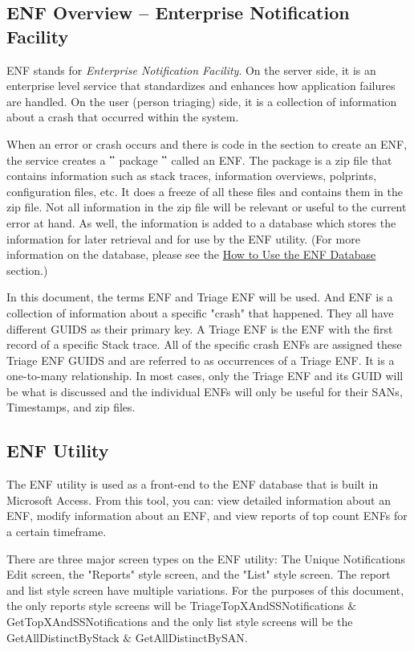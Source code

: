 \documentclass[a4paper,12pt]{report}
\begin{document}
\subsection*{ENF Overview – Enterprise Notification Facility}
 \par
ENF stands for \textit{Enterprise Notification Facility}. On the server side, it is an enterprise level service that standardizes and enhances how application failures are handled. On the user (person triaging) side, it is a collection of information about a crash that occurred within the system. \par
When an error or crash occurs and there is code in the section to create an ENF, the service creates a  $ " $ package $ " $  called an ENF. The package is a zip file that contains information such as stack traces, information overviews, polprints, configuration files, etc. It does a freeze of all these files and contains them in the zip file. Not all information in the zip file will be relevant or useful to the current error at hand. As well, the information is added to a database which stores the information for later retrieval and for use by the ENF utility. (For more information on the database, please see the \href{}{How to Use the ENF Database}
 section.)  \par
In this document, the terms ENF and Triage ENF will be used. And ENF is a collection of information about a specific "crash" that happened. They all have different GUIDS as their primary key. A Triage ENF is the ENF with the first record of a specific Stack trace. All of the specific crash ENFs are assigned these Triage ENF GUIDS and are referred to as occurrences of a Triage ENF. It is a one-to-many relationship. In most cases, only the Triage ENF and its GUID will be what is discussed and the individual ENFs will only be useful for their SANs, Timestamps, and zip files. \par
\subsection*{ENF Utility }
 \par
The ENF utility is used as a front-end to the ENF database that is built in Microsoft Access. From this tool, you can: view detailed information about an ENF, modify information about an ENF, and view reports of top count ENFs for a certain timeframe. \par
There are three major screen types on the ENF utility: The Unique Notifications Edit screen, the "Reports" style screen, and the "List" style screen. The report and list style screen have multiple variations. For the purposes of this document, the only reports style screens will be TriageTopXAndSSNotifications  $  \&  $  GetTopXAndSSNotifications and the only list style screens will be the GetAllDistinctByStack  $  \&  $  GetAllDistinctBySAN. \par
\end{document}
